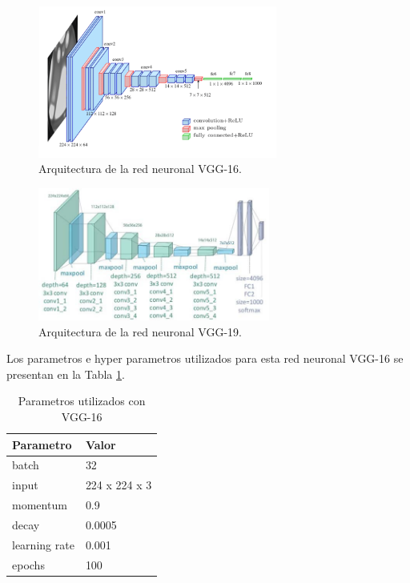 \documentclass{article}
\begin{document}
	\begin{figure}[H]
		\centering
		\includegraphics[width=0.7\textwidth]{img/vgg16}		
		\caption{Arquitectura de la red neuronal VGG-16.}
		\label{fig:vgg16}
	\end{figure} 
	\begin{figure}[H]
		\centering
		\includegraphics[width=0.68\textwidth]{img/vgg19}		
		\caption{Arquitectura de la red neuronal VGG-19.}
		\label{fig:vgg19}
	\end{figure}

	Los parametros e hyper parametros utilizados para esta red neuronal VGG-16 se presentan en la Tabla \ref{tab:vgg}.
	
	\begin{table}[h]
		\centering		
		\caption{Parametros utilizados con VGG-16}
		\label{tab:vgg}
		\begin{tabular}{ p{3cm} p{3cm}}
			\hline 
			\textbf{Parametro} & \textbf{Valor}   \\
			\hline 
			batch & 32 \\
			input & 224 x 224 x 3 \\
			momentum & 0.9 \\
			decay & 0.0005 \\
			learning rate & 0.001 \\
			epochs & 100 \\
			\hline 
		\end{tabular}
	\end{table}
	
\end{document}
